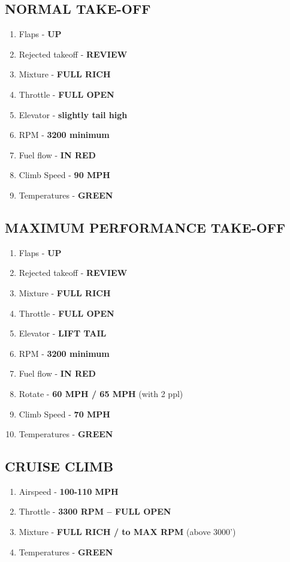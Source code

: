 \documentclass[14pt,letterpaper, twoside]{extarticle}
\begin{document}
\subsection{NORMAL TAKE-OFF}

\begin{enumerate}
\item Flaps - \textbf{UP}
\item Rejected takeoff - \textbf{REVIEW}
\item Mixture - \textbf{FULL RICH}
\item Throttle - \textbf{FULL OPEN}
\item Elevator - \textbf{slightly tail high}
\item RPM - \textbf{3200 minimum}
\item Fuel flow - \textbf{IN RED}
\item Climb Speed - \textbf{90 MPH}
\item Temperatures - \textbf{GREEN}
\end{enumerate}

\subsection{MAXIMUM PERFORMANCE TAKE-OFF}

\begin{enumerate}
\item Flaps - \textbf{UP}
\item Rejected takeoff - \textbf{REVIEW}
\item Mixture - \textbf{FULL RICH}
\item Throttle - \textbf{FULL OPEN}
\item Elevator - \textbf{LIFT TAIL}
\item RPM - \textbf{3200 minimum}
\item Fuel flow - \textbf{IN RED}
\item Rotate - \textbf{60 MPH / 65 MPH} (with 2 ppl)
\item Climb Speed - \textbf{70 MPH}
\item Temperatures - \textbf{GREEN}
\end{enumerate}
	
\subsection{CRUISE CLIMB}

\begin{enumerate}
\item Airspeed - \textbf{100-110 MPH}
\item Throttle - \textbf{3300 RPM -- FULL OPEN}
\item Mixture - \textbf{FULL RICH / to MAX RPM} (above 3000') 
\item Temperatures - \textbf{GREEN}
\end{enumerate}
	
\end{document}
